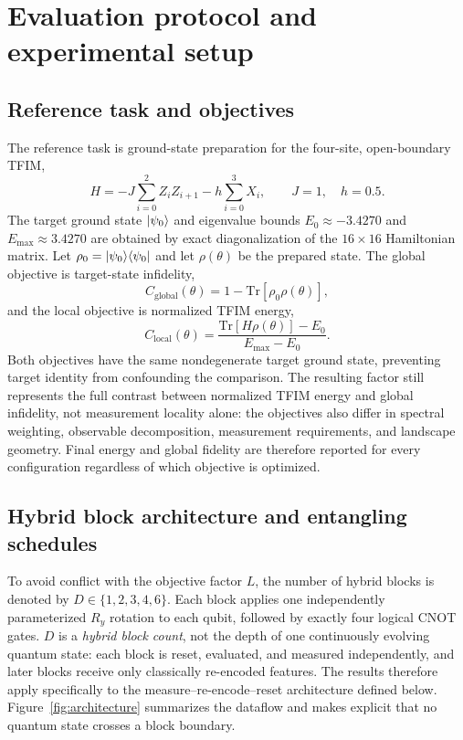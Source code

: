 \documentclass[pdflatex,sn-basic,Numbered]{sn-jnl}
\begin{document}
\section{Evaluation protocol and experimental setup}\label{sec:methods}
\subsection{Reference task and objectives}

The reference task is ground-state preparation for the four-site, open-boundary TFIM,
\[
H=-J\sum_{i=0}^{2}Z_i Z_{i+1}-h\sum_{i=0}^{3}X_i,
\qquad J=1,\quad h=0.5.
\]
The target ground state $\ket{\psi_0}$ and eigenvalue bounds $E_0\approx-3.4270$ and $E_{\max}\approx3.4270$ are obtained by exact diagonalization of the $16\times16$ Hamiltonian matrix. Let $\rho_0=\ket{\psi_0}\!\bra{\psi_0}$ and let $\rho(\theta)$ be the prepared state. The global objective is target-state infidelity,
\[
C_{\mathrm{global}}(\theta)
=1-\mathrm{Tr}[\rho_0\rho(\theta)],
\]
and the local objective is normalized TFIM energy,
\[
C_{\mathrm{local}}(\theta)
=\frac{\mathrm{Tr}[H\rho(\theta)]-E_0}{E_{\max}-E_0}.
\]
Both objectives have the same nondegenerate target ground state, preventing target identity from confounding the comparison. The resulting factor still represents the full contrast between normalized TFIM energy and global infidelity, not measurement locality alone: the objectives also differ in spectral weighting, observable decomposition, measurement requirements, and landscape geometry. Final energy and global fidelity are therefore reported for every configuration regardless of which objective is optimized.

\subsection{Hybrid block architecture and entangling schedules}
\label{sec:ansatz}

To avoid conflict with the objective factor $L$, the number of hybrid blocks is denoted by $D\in\{1,2,3,4,6\}$. Each block applies one independently parameterized $R_y$ rotation to each qubit, followed by exactly four logical CNOT gates. $D$ is a \emph{hybrid block count}, not the depth of one continuously evolving quantum state: each block is reset, evaluated, and measured independently, and later blocks receive only classically re-encoded features. The results therefore apply specifically to the measure--re-encode--reset architecture defined below. Figure~\ref{fig:architecture} summarizes the dataflow and makes explicit that no quantum state crosses a block boundary.
\end{document}

